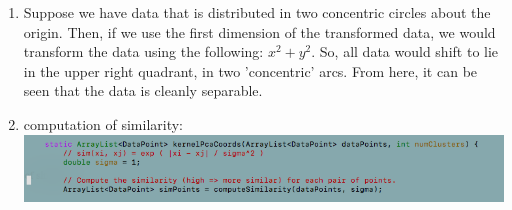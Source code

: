 \documentclass{article}
\begin{document}
\begin{enumerate}
\item Suppose we have data that is distributed in two concentric circles about the origin. Then, if we use the first dimension of the transformed data, we would transform the data using the following: $x^2 + y^2$. So, all data would shift to lie in the upper right quadrant, in two 'concentric' arcs. From here, it can be seen that the data is cleanly separable. 

\item computation of similarity: \\
\includegraphics[scale=0.5]{exercise29}


\end{enumerate}
\end{document}
